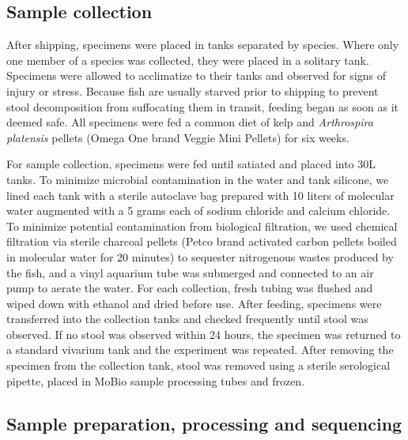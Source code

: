 





\subsection{Sample collection}

After shipping, specimens were placed in tanks separated by species. Where only one member of a species was collected, they were placed in a solitary tank. Specimens were allowed to acclimatize to their tanks and observed for signs of injury or stress. Because fish are usually starved prior to shipping to prevent stool decomposition from suffocating them in transit, feeding began as soon as it deemed safe. All specimens were fed a common diet of kelp and \textit{Arthrospira platensis} pellets (Omega One brand Veggie Mini Pellets) for six weeks. 

For sample collection, specimens were fed until satiated and placed into 30L tanks. To minimize microbial contamination in the water and tank silicone, we lined each tank with a sterile autoclave bag prepared with 10 liters of molecular water augmented with a 5 grams each of sodium chloride and calcium chloride. To minimize potential contamination from biological filtration, we used chemical filtration via sterile charcoal pellets (Petco brand activated carbon pellets boiled in molecular water for 20 minutes) to sequester nitrogenous wastes produced by the fish, and a vinyl aquarium tube was submerged and connected to an air pump to aerate the water. For each collection, fresh tubing was flushed and wiped down with ethanol and dried before use. After feeding, specimens were transferred into the collection tanks and checked frequently until stool was observed. If no stool was observed within 24 hours, the specimen was returned to a standard vivarium tank and the experiment was repeated. After removing the specimen from the collection tank, stool was removed using a sterile serological pipette, placed in MoBio sample processing tubes and frozen. 

\subsection{Sample preparation, processing and sequencing}

